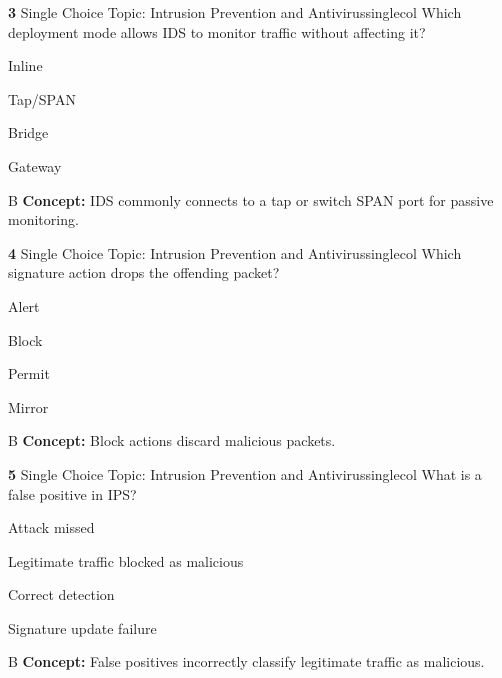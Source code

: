 \documentclass[10pt,a4paper]{article}
\begin{document}
\begin{qcard}{\color{white}\textbf{3} \hfill \small Single Choice \textbar{} Topic: Intrusion Prevention and Antivirus}{singlecol}
Which deployment mode allows IDS to monitor traffic without affecting it?

\begin{qoptions}
\item Inline
\item Tap/SPAN
\item Bridge
\item Gateway
\end{qoptions}
\begin{explainbox}{B}
\textbf{Concept:} IDS commonly connects to a tap or switch SPAN port for passive monitoring.
\end{explainbox}
\end{qcard}

\begin{qcard}{\color{white}\textbf{4} \hfill \small Single Choice \textbar{} Topic: Intrusion Prevention and Antivirus}{singlecol}
Which signature action drops the offending packet?

\begin{qoptions}
\item Alert
\item Block
\item Permit
\item Mirror
\end{qoptions}
\begin{explainbox}{B}
\textbf{Concept:} Block actions discard malicious packets.
\end{explainbox}
\end{qcard}

\begin{qcard}{\color{white}\textbf{5} \hfill \small Single Choice \textbar{} Topic: Intrusion Prevention and Antivirus}{singlecol}
What is a false positive in IPS?

\begin{qoptions}
\item Attack missed
\item Legitimate traffic blocked as malicious
\item Correct detection
\item Signature update failure
\end{qoptions}
\begin{explainbox}{B}
\textbf{Concept:} False positives incorrectly classify legitimate traffic as malicious.
\end{explainbox}
\end{qcard}
\end{document}
